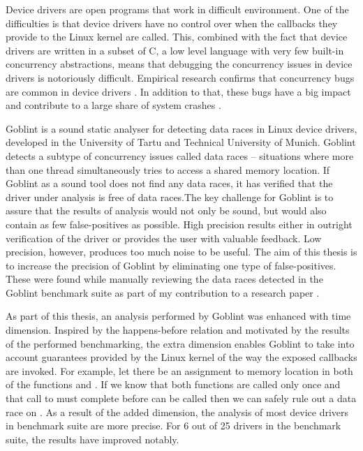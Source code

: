 \documentclass[..thesis.tex]{subfiles}
\begin{document}
 


Device drivers are open programs that work in difficult environment. One of the difficulties is that device drivers have no control over when the callbacks they provide to the Linux kernel
are called. This, combined with the fact that device drivers are written in a subset of C, a low level language with very few built-in concurrency abstractions,
means that debugging the concurrency issues in device drivers is notoriously difficult. Empirical research confirms that concurrency bugs are common in
device drivers \cite{chou_empirical_2001,palix_faults_2011}.  
In addition to that, these bugs have a big impact and contribute to a large share of system crashes \cite{swift_improving_2003}. 


Goblint is a sound static analyser for detecting data races in Linux device drivers, developed in the University of Tartu and Technical University of Munich. Goblint detects a subtype of concurrency issues called data races -- situations where more than one thread simultaneously tries to access a shared memory location.
If Goblint as a sound tool does not find any data races, it has verified that the driver under analysis is free of data races.The key challenge for Goblint is to assure that the results of analysis would not only be sound, but would also contain as few false-positives as possible. High precision results either in outright verification of the driver or provides the user with valuable feedback. Low precision, however, produces too much noise to be useful. The aim of this thesis is to increase the precision of Goblint by eliminating one type of false-positives. These were found while manually reviewing the data races detected in the Goblint benchmark suite as part of my contribution to a research paper \cite{vojdani_static_2016}.
  

As part of this thesis, an analysis performed by Goblint was enhanced with time dimension. Inspired by the happens-before relation and motivated by the results of the performed benchmarking,
the extra dimension enables Goblint to take into account guarantees provided by the Linux kernel of the way the exposed callbacks are invoked.
For example, let there be an assignment to memory location  in both of the functions  and . 
If we know that both functions are called only once and that call to  must complete before  can be called then we can safely rule out a data race on .
As a result of the added dimension, the analysis of most device drivers in benchmark suite are more precise. For 6 out of 25 drivers in the benchmark suite,
the results have improved notably.
\end{document}
